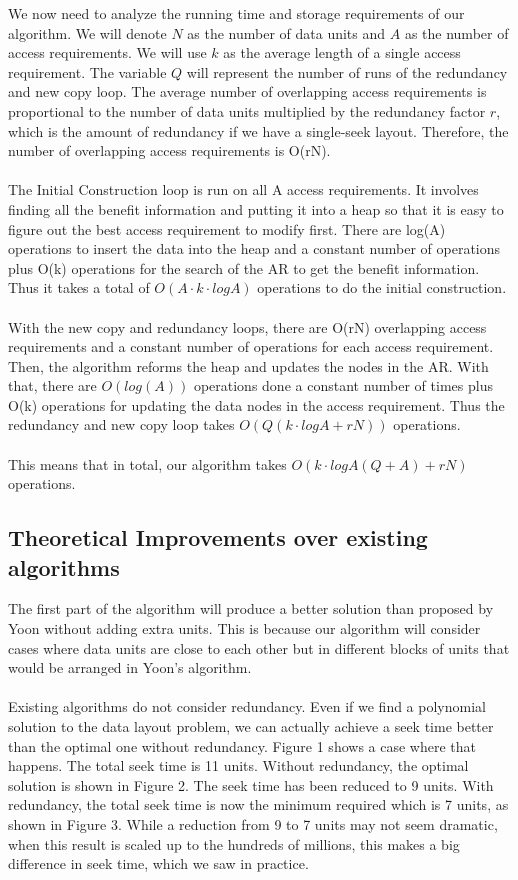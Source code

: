 \documentclass[conference]{acmsiggraph}
\begin{document}
We now need to analyze the running time and storage requirements of our algorithm. We will denote $N$ as the number of data units and $A$ as the number of access requirements. We will use $k$ as the average length of a single access requirement. The variable $Q$ will represent the number of runs of the redundancy and new copy loop. The average number of overlapping access requirements is proportional to the number of data units multiplied by the redundancy factor $r$, which is the amount of redundancy if we have a single-seek layout. Therefore, the number of overlapping access requirements is O(rN). \\
\\
The Initial Construction loop is run on all A access requirements. It involves finding all the benefit information and putting it into a heap so that it is easy to figure out the best access requirement to modify first. There are log(A) operations to insert the data into the heap and a constant number of operations plus O(k) operations for the search of the AR to get the benefit information. Thus it takes a total of $O(A \cdot k \cdot logA)$ operations to do the initial construction. \\
\\
With the new copy and redundancy loops, there are O(rN) overlapping access requirements and a constant number of operations for each access requirement. Then, the algorithm reforms the heap and updates the nodes in the AR. With that, there are $O(log(A))$ operations done a constant number of times plus O(k) operations for updating the data nodes in the access requirement. Thus the redundancy and new copy loop takes $O(Q(k \cdot logA + rN))$ operations. \\
\\
This means that in total, our algorithm takes $O( k \cdot logA (Q+A) + rN)$ operations. 

\subsection*{Theoretical Improvements over existing algorithms}

The first part of the algorithm will produce a better solution than proposed by Yoon without adding extra units. This is because our algorithm will consider cases where data units are close to each other but in different blocks of units that would be arranged in Yoon's algorithm. \\
\\
Existing algorithms do not consider redundancy. Even if we find a polynomial solution to the data layout problem, we can actually achieve a seek time better than the optimal one without redundancy. Figure 1 shows a case where that happens. The total seek time is 11 units. Without redundancy, the optimal solution is shown in Figure 2. The seek time has been reduced to 9 units. With redundancy, the total seek time is now the minimum required which is 7 units, as shown in Figure 3. While a reduction from 9 to 7 units may not seem dramatic, when this result is scaled up to the hundreds of millions, this makes a big difference in seek time, which we saw in practice.\\
\end{document}
